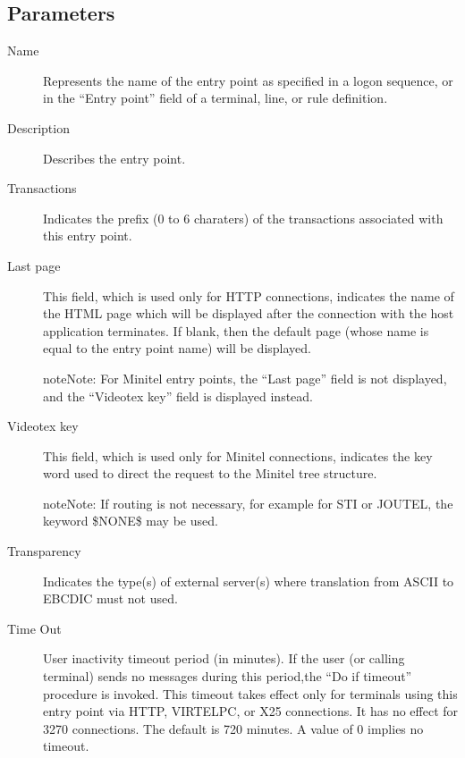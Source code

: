 \documentclass[letterpaper,10pt,english]{sphinxmanual}
\begin{document}
\subsection{Parameters}
\label{\detokenize{connectivity_guide:index-109}}\label{\detokenize{connectivity_guide:id59}}\begin{description}
\item[{Name}] \leavevmode
Represents the name of the entry point as specified in a logon sequence, or in the “Entry point” field of a terminal, line, or rule definition.

\item[{Description}] \leavevmode
Describes the entry point.

\item[{Transactions}] \leavevmode
Indicates the prefix (0 to 6 charaters) of the transactions associated with this entry point.

\item[{Last page}] \leavevmode
This field, which is used only for HTTP connections, indicates the name of the HTML page which will be displayed after the connection with the host application terminates. If blank, then the default page (whose name is equal to the entry point name) will be displayed.

\begin{sphinxadmonition}{note}{Note:}
For Minitel entry points, the “Last page” field is not displayed, and the “Videotex key” field is displayed instead.
\end{sphinxadmonition}

\item[{Videotex key}] \leavevmode
This field, which is used only for Minitel connections, indicates the key word used to direct the request to the Minitel tree structure.

\begin{sphinxadmonition}{note}{Note:}
If routing is not necessary, for example for STI or JOUTEL, the keyword \$NONE\$ may be used.
\end{sphinxadmonition}

\item[{Transparency}] \leavevmode
Indicates the type(s) of external server(s) where translation from ASCII to EBCDIC must not used.

\item[{Time Out}] \leavevmode
User inactivity timeout period (in minutes). If the user (or calling terminal) sends no messages during this period,the “Do if timeout” procedure is invoked. This timeout takes effect only for terminals using this entry point via HTTP, VIRTELPC, or X25 connections. It has no effect for 3270 connections. The default is 720 minutes. A value of 0 implies no timeout.


\end{description}
\end{document}
